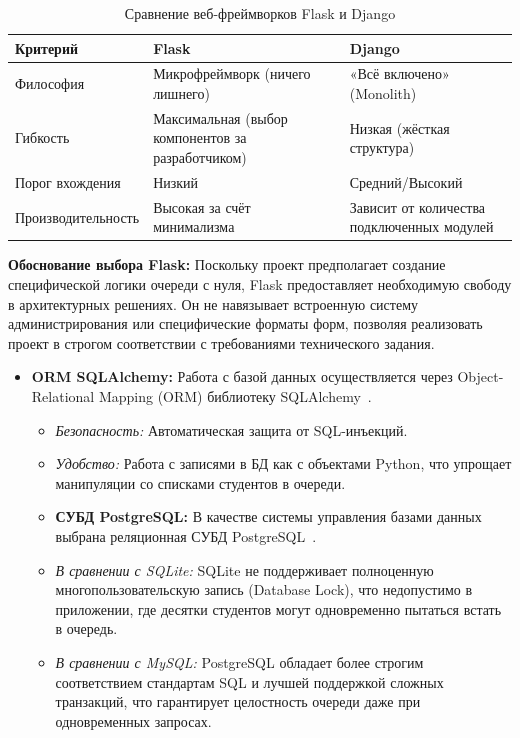 \begin{table}[ht!]
 \centering
 \caption{Сравнение веб-фреймворков Flask и Django}
 \label{tab:flask_vs_django}
 \begin{tabular}{lp{3cm}p{3cm}}
  \toprule
  \textbf{Критерий} & \textbf{Flask} & \textbf{Django} \\
  \midrule
  Философия         & Микрофреймворк (ничего лишнего) & «Всё включено» (Monolith) \\
  Гибкость          & Максимальная (выбор компонентов за разработчиком) & Низкая (жёсткая структура) \\
  Порог вхождения   & Низкий & Средний/Высокий \\
  Производительность & Высокая за счёт минимализма & Зависит от количества подключенных модулей \\
  \bottomrule
 \end{tabular}
\end{table}

\textbf{Обоснование выбора Flask:} Поскольку проект предполагает создание специфической 
логики очереди с нуля, Flask предоставляет необходимую свободу в архитектурных решениях. Он не навязывает 
встроенную систему администрирования или специфические форматы форм, позволяя реализовать проект в строгом соответствии 
с требованиями технического задания.

\begin{itemize}
 \item \textbf{ORM SQLAlchemy:} Работа с базой данных осуществляется через Object-Relational Mapping
 (ORM) библиотеку SQLAlchemy~\cite{sqlalchemy_docs}.
 \begin{itemize}
  \item \textit{Безопасность:} Автоматическая защита от SQL-инъекций.
  \item \textit{Удобство:} Работа с записями в БД как с объектами Python, что упрощает манипуляции 
  со списками студентов в очереди.
 \item \textbf{СУБД PostgreSQL:} В качестве системы управления базами данных выбрана реляционная СУБД PostgreSQL~\cite{postgresql_docs}.
  \end{itemize}
  
 \begin{itemize}
  \item \textit{В сравнении с SQLite:} SQLite не поддерживает полноценную многопользовательскую запись 
  (Database Lock), что недопустимо в приложении, где десятки студентов могут одновременно пытаться встать в очередь.
  \item \textit{В сравнении с MySQL:} PostgreSQL обладает более строгим соответствием стандартам SQL 
  и лучшей поддержкой сложных транзакций, что гарантирует целостность очереди даже при одновременных запросах.
 \end{itemize}
\end{itemize}

